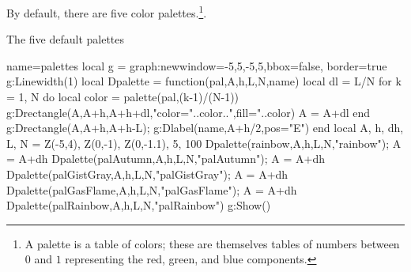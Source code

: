 By default, there are five color palettes.\footnote{A palette is a table of colors; these are themselves tables of numbers between $0$ and $1$ representing the red, green, and blue components.}.

\begin{demo}{The five default palettes}
\begin{luadraw}{name=palettes}
local g = graph:new{window={-5,5,-5,5},bbox=false, border=true}
g:Linewidth(1)
local Dpalette = function(pal,A,h,L,N,name)
    local dl = L/N
    for k = 1, N do
        local color = palette(pal,(k-1)/(N-1))
        g:Drectangle(A,A+h,A+h+dl,"color="..color..",fill="..color)
        A = A+dl
    end
    g:Drectangle(A,A+h,A+h-L); g:Dlabel(name,A+h/2,{pos="E"})
end
local A, h, dh, L, N = Z(-5,4), Z(0,-1), Z(0,-1.1), 5, 100
Dpalette(rainbow,A,h,L,N,"rainbow"); A = A+dh
Dpalette(palAutumn,A,h,L,N,"palAutumn"); A = A+dh
Dpalette(palGistGray,A,h,L,N,"palGistGray"); A = A+dh
Dpalette(palGasFlame,A,h,L,N,"palGasFlame"); A = A+dh
Dpalette(palRainbow,A,h,L,N,"palRainbow")
g:Show()
\end{luadraw}
\end{demo}
